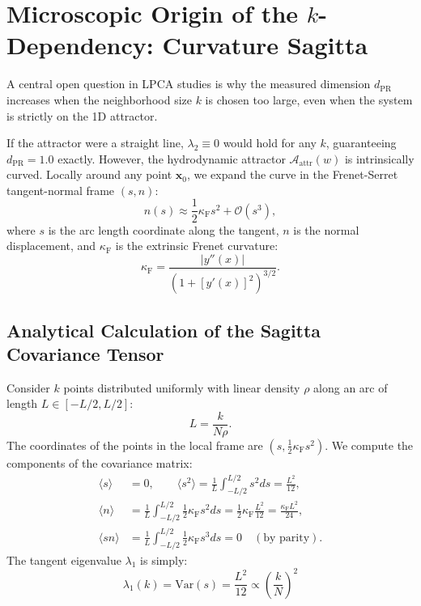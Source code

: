 \documentclass[11pt,a4paper]{article}
\begin{document}
\section{Microscopic Origin of the \texorpdfstring{$k$}{k}-Dependency: Curvature Sagitta}
\label{sec:curvature_sagitta}
A central open question in LPCA studies is why the measured dimension $d_{\mathrm{PR}}$ increases when the neighborhood size $k$ is chosen too large, even when the system is strictly on the 1D attractor.

If the attractor were a straight line, $\lambda_2 \equiv 0$ would hold for any $k$, guaranteeing $d_{\mathrm{PR}} = 1.0$ exactly. However, the hydrodynamic attractor $\mathcal{A}_{\mathrm{attr}}(w)$ is intrinsically curved. Locally around any point $\mathbf{x}_0$, we expand the curve in the Frenet-Serret tangent-normal frame $(s, n)$:
\begin{equation}
    n(s) \approx \frac{1}{2} \kappa_{\mathrm{F}} s^2 + \mathcal{O}(s^3),
    \label{eq:parabolic_arc}
\end{equation}
where $s$ is the arc length coordinate along the tangent, $n$ is the normal displacement, and $\kappa_{\mathrm{F}}$ is the extrinsic Frenet curvature:
\begin{equation}
    \kappa_{\mathrm{F}} = \frac{|y''(x)|}{\left(1 + [y'(x)]^2\right)^{3/2}}.
    \label{eq:frenet_curvature}
\end{equation}

\subsection{Analytical Calculation of the Sagitta Covariance Tensor}
Consider $k$ points distributed uniformly with linear density $\rho$ along an arc of length $L \in [-L/2, L/2]$:
\begin{equation}
    L = \frac{k}{N \rho}.
    \label{eq:arc_length}
\end{equation}
The coordinates of the points in the local frame are $(s, \frac{1}{2}\kappa_{\mathrm{F}} s^2)$. We compute the components of the covariance matrix:
\begin{align}
    \langle s \rangle &= 0, \qquad \langle s^2 \rangle = \frac{1}{L}\int_{-L/2}^{L/2} s^2 ds = \frac{L^2}{12}, \label{eq:cov_s}\\
    \langle n \rangle &= \frac{1}{L}\int_{-L/2}^{L/2} \frac{1}{2}\kappa_{\mathrm{F}} s^2 ds = \frac{1}{2}\kappa_{\mathrm{F}} \frac{L^2}{12} = \frac{\kappa_{\mathrm{F}} L^2}{24}, \label{eq:cov_n_mean}\\
    \langle s n \rangle &= \frac{1}{L}\int_{-L/2}^{L/2} \frac{1}{2}\kappa_{\mathrm{F}} s^3 ds = 0 \quad (\text{by parity}). \label{eq:cov_sn}
\end{align}
The tangent eigenvalue $\lambda_1$ is simply:
\begin{equation}
    \boxed{\lambda_1(k) = \mathrm{Var}(s) = \frac{L^2}{12} \propto \left(\frac{k}{N}\right)^2}
    \label{eq:lambda1_scaling}
\end{equation}
\end{document}

